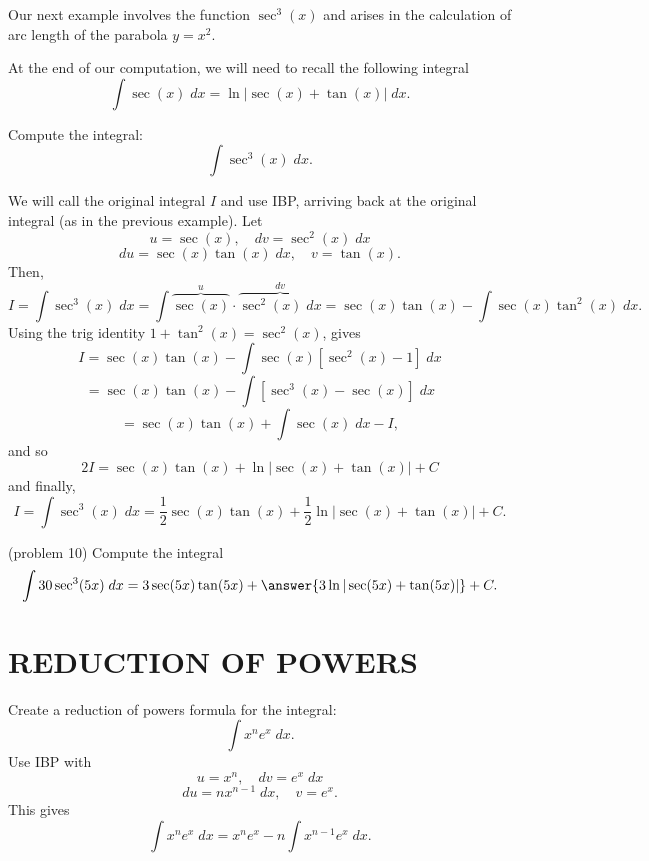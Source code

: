 \documentclass{ximera}
\begin{document}
Our next example involves the function $\sec^3(x)$ and arises in the calculation of arc length 
of the parabola $y = x^2$.

At the end of our computation, we will need to recall the following integral
\[
\int \sec(x) \; dx = \ln|\sec(x) + \tan(x)| \; dx.
\]

\begin{example}[example 10]
Compute the integral:
\[
\int \sec^3(x) \; dx.
\]

We will call the original integral $I$ and use IBP, arriving back at the original integral (as in the previous example).
Let
\[
u = \sec(x), \quad dv = \sec^2(x) \; dx
\]
\[
du = \sec(x)\tan(x) \; dx, \quad v = \tan(x).
\]
Then,
\[
I = \int \sec^3(x) \; dx = \int \overbrace{\sec(x)}^u \cdot \overbrace{\sec^2(x) \; dx}^{dv} = \sec(x) \tan(x) - \int \sec(x) \tan^2(x) \; dx.
\]
Using the trig identity $1 + \tan^2(x) = \sec^2(x)$, gives
\[
I = \sec(x) \tan(x) - \int \sec(x) [\sec^2(x) -1] \; dx
\]
\[
=\sec(x) \tan(x) - \int  [\sec^3(x) -\sec(x)] \; dx 
\]
\[
= \sec(x) \tan(x) + \int \sec(x)\; dx -I,
\]
and so
\[
2I = \sec(x) \tan(x) + \ln|\sec(x) + \tan(x)| + C
\]
and finally,
\[
I = \int \sec^3(x) \; dx = \frac12 \sec(x) \tan(x) + \frac12 \ln|\sec(x) + \tan(x)| + C.
\]
\end{example}

\begin{problem}(problem 10)
Compute the integral
\[
\int 30\sec^3(5x) \; dx = 3\sec(5x) \tan(5x) +  \answer{3\ln|\sec(5x) + \tan(5x)|} + C.
\]
\end{problem}


\section{REDUCTION OF POWERS}


\begin{example}[example 11]
Create a reduction of powers formula for the integral:
\[
\int x^n e^x \; dx.
\]
Use IBP with
\[
u = x^n, \quad dv = e^x \; dx
\]
\[
du = nx^{n-1}\; dx,  \quad v = e^x.
\]
This gives
\[
\int x^n e^x \; dx = x^n e^x - n\int x^{n-1} e^x \; dx.
\]
\end{example}
\end{document}
